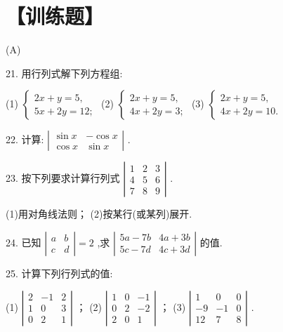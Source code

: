\documentclass[10pt]{article}
\begin{document}
\section*{【训练题】}

(A)

21. 用行列式解下列方程组:

(1) \(\left\{  \begin{array}{l} {2x} + y = 5, \\  {5x} + {2y} = {12}; \end{array}\right.\) (2) \(\left\{  \begin{array}{l} {2x} + y = 5, \\  {4x} + {2y} = 3; \end{array}\right.\) (3) \(\left\{  \begin{array}{l} {2x} + y = 5, \\  {4x} + {2y} = {10}. \end{array}\right.\)

22. 计算: \(\left| \begin{array}{rr} \sin x &  - \cos x \\  \cos x & \sin x \end{array}\right|\) .

23. 按下列要求计算行列式 \(\left| \begin{array}{lll} 1 & 2 & 3 \\  4 & 5 & 6 \\  7 & 8 & 9 \end{array}\right|\) .

(1)用对角线法则； (2)按某行(或某列)展开.

24. 已知 \(\left| \begin{array}{ll} a & b \\  c & d \end{array}\right|  = 2\) ,求 \(\left| \begin{matrix} {5a} - {7b} & {4a} + {3b} \\  {5c} - {7d} & {4c} + {3d} \end{matrix}\right|\) 的值.

25. 计算下列行列式的值:

(1) \(\left| \begin{matrix} 2 &  - 1 & 2 \\  1 & 0 & 3 \\  0 & 2 & 1 \end{matrix}\right|\) ； (2) \(\left| \begin{matrix} 1 & 0 &  - 1 \\  0 & 2 &  - 2 \\  2 & 0 & 1 \end{matrix}\right|\) ； (3) \(\left| \begin{matrix} 1 & 0 & 0 \\   - 9 &  - 1 & 0 \\  {12} & 7 & 8 \end{matrix}\right|\) .
\end{document}
